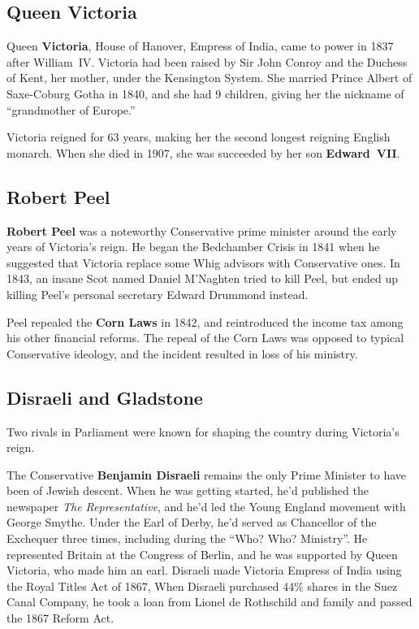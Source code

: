 \subsection*{Queen Victoria}

Queen \textbf{Victoria}, House of Hanover, Empress of India,
came to power in 1837 after William~IV\@.
Victoria had been raised by Sir John Conroy and the Duchess of Kent,
her mother, under the Kensington System.
She married Prince Albert of Saxe-Coburg Gotha in 1840, and she had 9 children,
giving her the nickname of ``grandmother of Europe.''

Victoria reigned for 63 years, making her the second longest reigning English monarch.
When she died in 1907, she was succeeded by her son \textbf{Edward~VII}.

\subsection*{Robert Peel}

\textbf{Robert Peel} was a noteworthy Conservative prime minister
around the early years of Victoria's reign.
He began the Bedchamber Crisis in 1841
when he suggested that Victoria replace some Whig advisors with Conservative ones.
In 1843, an insane Scot named Daniel M'Naghten tried to kill Peel,
but ended up killing Peel's personal secretary Edward Drummond instead.

Peel repealed the \textbf{Corn Laws} in 1842,
and reintroduced the income tax among his other financial reforms.
The repeal of the Corn Laws was opposed to typical Conservative ideology,
and the incident resulted in loss of his ministry.

\subsection*{Disraeli and Gladstone}

Two rivals in Parliament were known for shaping the country during Victoria's reign.

The Conservative \textbf{Benjamin Disraeli}
remains the only Prime Minister to have been of Jewish descent.
When he was getting started, he'd published the newspaper \textit{The Representative},
and he'd led the Young England movement with George Smythe.
Under the Earl of Derby, he'd served as Chancellor of the Exchequer three times,
including during the ``Who? Who? Ministry''.
He represented Britain at the Congress of Berlin,
and he was supported by Queen Victoria, who made him an earl.
Disraeli made Victoria Empress of India using the Royal Titles Act of 1867,
When Disraeli purchased 44\% shares in the Suez Canal Company,
he took a loan from Lionel de Rothschild and family and passed the 1867 Reform Act.

